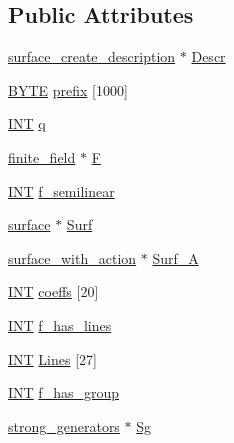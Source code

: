 \subsection*{Public Attributes}
\begin{DoxyCompactItemize}
\item 
\mbox{\hyperlink{classsurface__create__description}{surface\+\_\+create\+\_\+description}} $\ast$ \mbox{\hyperlink{classsurface__create_ab552f7961d6954c8e3ead8cc9acb5ccf}{Descr}}
\item 
\mbox{\hyperlink{galois_8h_ab6cc7b4aeb6ea31aba2b3fbfc83ff5e6}{B\+Y\+TE}} \mbox{\hyperlink{classsurface__create_a3460a3c194ba5ce0141943c7077ae63c}{prefix}} \mbox{[}1000\mbox{]}
\item 
\mbox{\hyperlink{galois_8h_a09fddde158a3a20bd2dcadb609de11dc}{I\+NT}} \mbox{\hyperlink{classsurface__create_a17229ddab1ed1c363ad0e5162ce120ae}{q}}
\item 
\mbox{\hyperlink{classfinite__field}{finite\+\_\+field}} $\ast$ \mbox{\hyperlink{classsurface__create_aefb0009a8b510eb431dd83cb8b19b40e}{F}}
\item 
\mbox{\hyperlink{galois_8h_a09fddde158a3a20bd2dcadb609de11dc}{I\+NT}} \mbox{\hyperlink{classsurface__create_a125813e28467c5e25026d2017890bf06}{f\+\_\+semilinear}}
\item 
\mbox{\hyperlink{classsurface}{surface}} $\ast$ \mbox{\hyperlink{classsurface__create_af9e58744bf71a42a65b22fd1c1624adb}{Surf}}
\item 
\mbox{\hyperlink{classsurface__with__action}{surface\+\_\+with\+\_\+action}} $\ast$ \mbox{\hyperlink{classsurface__create_a2e70c5ea8c284723e7b77dca8023dd2a}{Surf\+\_\+A}}
\item 
\mbox{\hyperlink{galois_8h_a09fddde158a3a20bd2dcadb609de11dc}{I\+NT}} \mbox{\hyperlink{classsurface__create_ae16c66cb9cecc55e9e4b55d1c5fb0857}{coeffs}} \mbox{[}20\mbox{]}
\item 
\mbox{\hyperlink{galois_8h_a09fddde158a3a20bd2dcadb609de11dc}{I\+NT}} \mbox{\hyperlink{classsurface__create_a2732fa27ea25fa56772d58610f668e5a}{f\+\_\+has\+\_\+lines}}
\item 
\mbox{\hyperlink{galois_8h_a09fddde158a3a20bd2dcadb609de11dc}{I\+NT}} \mbox{\hyperlink{classsurface__create_afea24eb6d2bd4b56629607841cd31154}{Lines}} \mbox{[}27\mbox{]}
\item 
\mbox{\hyperlink{galois_8h_a09fddde158a3a20bd2dcadb609de11dc}{I\+NT}} \mbox{\hyperlink{classsurface__create_af1bc7557e7061e079d15aa3452c2bad8}{f\+\_\+has\+\_\+group}}
\item 
\mbox{\hyperlink{classstrong__generators}{strong\+\_\+generators}} $\ast$ \mbox{\hyperlink{classsurface__create_a4dd2966771b46e2195039f81316181d3}{Sg}}
\end{DoxyCompactItemize}


